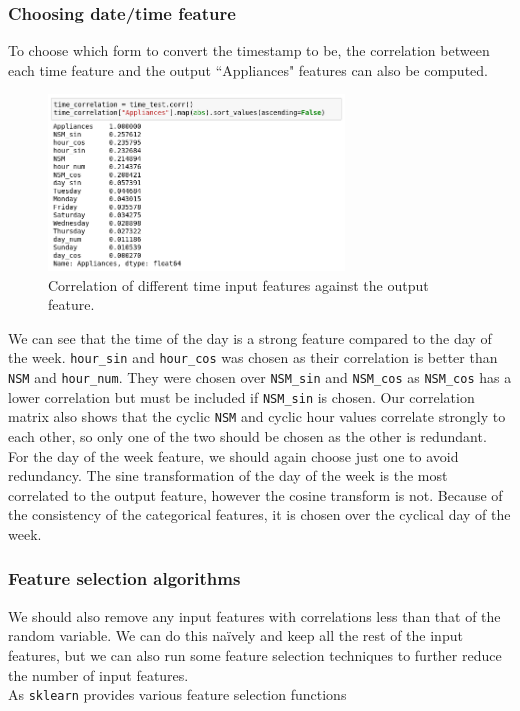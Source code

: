 \documentclass{article}
\newcommand{\n}[0]{\\[\baselineskip]}
\begin{document}
\subsubsection{Choosing date/time feature}
To choose which form to convert the timestamp to be, the correlation between each time feature and the output ``Appliances" features can also be computed. 
\begin{figure}[H]
\centering
\includegraphics[width=0.7\textwidth, keepaspectratio]{imgs/time-correlation.png}
\caption{Correlation of different time input features against the output feature.}
\end{figure}
\noindent
We can see that the time of the day is a strong feature compared to the day of the week.  \texttt{hour\_sin} and \texttt{hour\_cos} was chosen as their correlation is better than \texttt{NSM} and \texttt{hour\_num}. They were chosen over \texttt{NSM\_sin} and \texttt{NSM\_cos} as \texttt{NSM\_cos} has a lower correlation but must be included if \texttt{NSM\_sin} is chosen. Our correlation matrix also shows that the cyclic \texttt{NSM} and cyclic hour values correlate strongly to each other, so only one of the two should be chosen as the other is redundant. 
\n
For the day of the week feature, we should again choose just one to avoid redundancy. The sine transformation of the day of the week is the most correlated to the output feature, however the cosine transform is not. Because of the consistency of the categorical features, it is chosen over the cyclical day of the week. 

\subsubsection{Feature selection algorithms}
We should also remove any input features with correlations less than that of the random variable. We can do this na\"{i}vely and keep all the rest of the input features, but we can also run some feature selection techniques to further reduce the number of input features.
\n
As \texttt{sklearn} provides various feature selection functions
\end{document}
